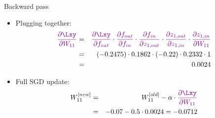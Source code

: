 \begin{vbframe}{Backward pass}
  \begin{itemize}
    \item Plugging together: 
      \begin{eqnarray*}
         \textcolor{violet}{\frac{\partial \Lxy}{\partial W_{11}}} &=& 
         \textcolor{violet}{\frac{\partial \Lxy}{\partial f_{out}}} \cdot  \textcolor{violet}{\frac{\partial f_{out}}{\partial f_{in}}} \cdot  \textcolor{violet}{\frac{\partial f_{in}}{\partial z_{1,out}}} \cdot  \textcolor{violet}{\frac{\partial z_{1,out}}{\partial z_{1,in}}} \cdot  \textcolor{violet}{\frac{\partial z_{1,in}}{\partial W_{11}}} 
        \\ &=& (\num[round-mode=places,round-precision=4]{-0.2474531}) \cdot \num[round-mode=places,round-precision=4]{0.1862201} \cdot (-0.22) \cdot \num[round-mode=places,round-precision=4]{0.2332341} \cdot 1 
        \\ &=& \num[round-mode=places,round-precision=4]{0.0023645}
      \end{eqnarray*}
  \begin{figure}
    \centering
  \end{figure}

    \item Full SGD update: 
    \begin{eqnarray*}
      W_{11}^{[new]}  &=& W_{11}^{[old]} - \alpha \cdot  \textcolor{violet}{\frac{\partial \Lxy}{\partial W_{11}}} \\
                  &=& -0.07 - 0.5 \cdot \num[round-mode=places,round-precision=4]{0.0023645} = \num[round-mode=places,round-precision=4]{-0.0711823}
    \end{eqnarray*}
  \end{itemize}
\end{vbframe}

